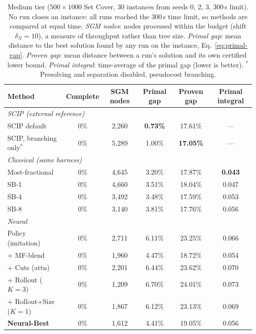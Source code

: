 \documentclass[11pt,a4paper]{article}
\begin{document}
\begin{table}[t]
\caption{Medium tier ($500\times1000$ Set Cover, 30 instances from seeds 0, 2, 3, $300$\,s limit). No run closes an instance: all runs reached the 300\,s time limit, so methods are compared at equal time. \emph{SGM nodes}: nodes processed within the budget (shift $\delta_N{=}10$), a measure of throughput rather than tree size. \emph{Primal gap}: mean distance to the best solution found by any run on the instance, Eq.~\eqref{eq:primal-gap}. \emph{Proven gap}: mean distance between a run's solution and its own certified lower bound. \emph{Primal integral}: time-average of the primal gap (lower is better). $^\ast$Presolving and separation disabled, pseudocost branching.}
\label{tab:main}
\begin{center}
\begin{tabular}{lccccc}
\toprule
Method & Complete & SGM nodes & Primal gap & Proven gap & Primal integral \\
\midrule
\multicolumn{6}{l}{\emph{SCIP (external reference)}} \\
SCIP default                 & 0\% & 2{,}260 & \textbf{0.73\%} & 17.61\% & --- \\
SCIP, branching only$^\ast$  & 0\% & 5{,}289 & 1.00\% & \textbf{17.05\%} & --- \\
\midrule
\multicolumn{6}{l}{\emph{Classical (same harness)}} \\
Most-fractional        & 0\% & 4{,}645 & 3.20\% & 17.87\% & \textbf{0.043} \\
SB-1                   & 0\% & 4{,}660 & 3.51\% & 18.04\% & 0.047 \\
SB-4                   & 0\% & 3{,}492 & 3.48\% & 17.59\% & 0.053 \\
SB-8                   & 0\% & 3{,}140 & 3.81\% & 17.76\% & 0.056 \\
\midrule
\multicolumn{6}{l}{\emph{Neural}} \\
Policy (imitation)     & 0\% & 2{,}711 & 6.11\% & 23.25\% & 0.066 \\
\quad + MF-blend       & 0\% & 1{,}960 & 4.47\% & 18.72\% & 0.054 \\
\quad + Cuts (attn)    & 0\% & 2{,}201 & 6.44\% & 23.62\% & 0.070 \\
\quad + Rollout ($K{=}3$)      & 0\% & 1{,}209 & 6.70\% & 24.01\% & 0.073 \\
\quad + Rollout+Size ($K{=}1$) & 0\% & 1{,}867 & 6.12\% & 23.13\% & 0.069 \\
\textbf{Neural-Best}   & 0\% & 1{,}612 & 4.41\% & 19.05\% & 0.056 \\
\bottomrule
\end{tabular}
\end{center}
\end{table}
\end{document}
